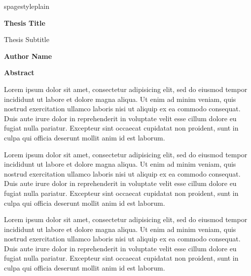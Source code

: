 spagestyle{plain}
\begin{center}
    \Large
    \textbf{Thesis Title}
    
    \vspace{0.4cm}
    \large
    Thesis Subtitle
    
    \vspace{0.4cm}
    \textbf{Author Name}
    
    \vspace{0.9cm}
    \textbf{Abstract}
\end{center}
Lorem ipsum dolor sit amet, consectetur adipisicing elit, sed do eiusmod tempor incididunt ut labore et dolore magna
aliqua. Ut enim ad minim veniam, quis nostrud exercitation ullamco laboris nisi ut aliquip ex ea commodo consequat. Duis
aute irure dolor in reprehenderit in voluptate velit esse cillum dolore eu fugiat nulla pariatur. Excepteur sint
occaecat cupidatat non proident, sunt in culpa qui officia deserunt mollit anim id est laborum.

Lorem ipsum dolor sit amet, consectetur adipisicing elit, sed do eiusmod tempor incididunt ut labore et dolore magna
aliqua. Ut enim ad minim veniam, quis nostrud exercitation ullamco laboris nisi ut aliquip ex ea commodo consequat. Duis
aute irure dolor in reprehenderit in voluptate velit esse cillum dolore eu fugiat nulla pariatur. Excepteur sint
occaecat cupidatat non proident, sunt in culpa qui officia deserunt mollit anim id est laborum.

Lorem ipsum dolor sit amet, consectetur adipisicing elit, sed do eiusmod tempor incididunt ut labore et dolore magna
aliqua. Ut enim ad minim veniam, quis nostrud exercitation ullamco laboris nisi ut aliquip ex ea commodo consequat. Duis
aute irure dolor in reprehenderit in voluptate velit esse cillum dolore eu fugiat nulla pariatur. Excepteur sint
occaecat cupidatat non proident, sunt in culpa qui officia deserunt mollit anim id est laborum.
